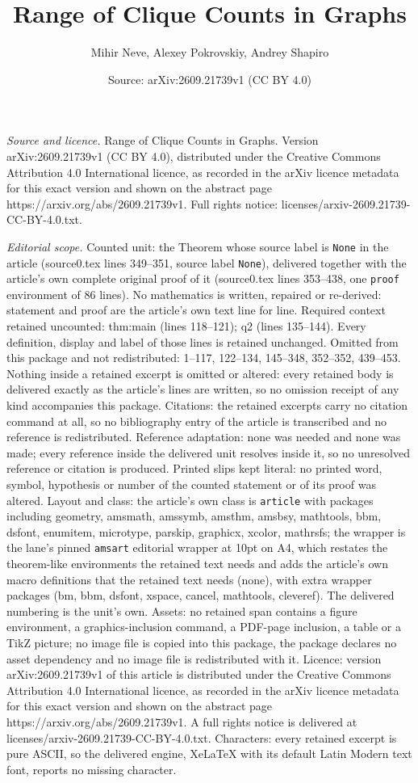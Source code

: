 \documentclass[10pt,a4paper]{amsart}
\title[Range of Clique Counts in Graphs]{Range of Clique Counts in Graphs}
\author{Mihir Neve, Alexey Pokrovskiy, Andrey Shapiro}
\date{Source: arXiv:2609.21739v1 (CC BY 4.0)}
\begin{document}
\maketitle

\noindent\emph{Source and licence.} Range of Clique Counts in Graphs. Version arXiv:2609.21739v1 (CC BY 4.0), distributed under the Creative Commons Attribution 4.0 International licence, as recorded in the arXiv licence metadata for this exact version and shown on the abstract page https://arxiv.org/abs/2609.21739v1. Full rights notice: licenses/arxiv-2609.21739-CC-BY-4.0.txt.\par\smallskip

\noindent\textit{Editorial scope.} Counted unit: the Theorem whose source label is \texttt{None} in the article (source0.tex lines 349--351, source label \texttt{None}), delivered together with the article's own complete original proof of it (source0.tex lines 353--438, one \texttt{proof} environment of 86 lines). No mathematics is written, repaired or re-derived: statement and proof are the article's own text line for line. Required context retained uncounted: thm:main (lines 118--121); q2 (lines 135--144). Every definition, display and label of those lines is retained unchanged. Omitted from this package and not redistributed: 1--117, 122--134, 145--348, 352--352, 439--453. Nothing inside a retained excerpt is omitted or altered: every retained body is delivered exactly as the article's lines are written, so no omission receipt of any kind accompanies this package. Citations: the retained excerpts carry no citation command at all, so no bibliography entry of the article is transcribed and no reference is redistributed. Reference adaptation: none was needed and none was made; every reference inside the delivered unit resolves inside it, so no unresolved reference or citation is produced. Printed slips kept literal: no printed word, symbol, hypothesis or number of the counted statement or of its proof was altered. Layout and class: the article's own class is \texttt{article} with packages including geometry, amsmath, amssymb, amsthm, amsbsy, mathtools, bbm, dsfont, enumitem, microtype, parskip, graphicx, xcolor, mathrsfs; the wrapper is the lane's pinned \texttt{amsart} editorial wrapper at 10pt on A4, which restates the theorem-like environments the retained text needs and adds the article's own macro definitions that the retained text needs (none), with extra wrapper packages (bm, bbm, dsfont, xspace, cancel, mathtools, cleveref). The delivered numbering is the unit's own. Assets: no retained span contains a figure environment, a graphics-inclusion command, a PDF-page inclusion, a table or a TikZ picture; no image file is copied into this package, the package declares no asset dependency and no image file is redistributed with it. Licence: version arXiv:2609.21739v1 of this article is distributed under the Creative Commons Attribution 4.0 International licence, as recorded in the arXiv licence metadata for this exact version and shown on the abstract page https://arxiv.org/abs/2609.21739v1. A full rights notice is delivered at licenses/arxiv-2609.21739-CC-BY-4.0.txt. Characters: every retained excerpt is pure ASCII, so the delivered engine, XeLaTeX with its default Latin Modern text font, reports no missing character.
\end{document}
